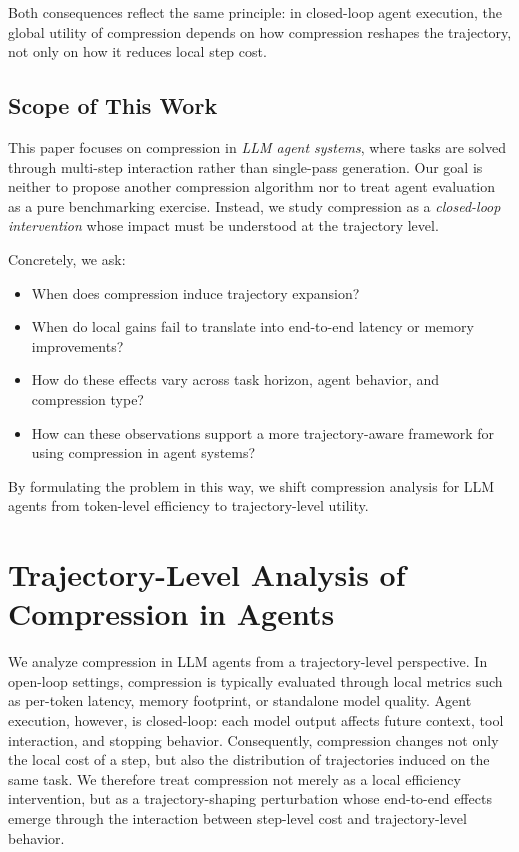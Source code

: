 \documentclass{article}
\begin{document}
Both consequences reflect the same principle: in closed-loop agent execution, the global utility of compression depends on how compression reshapes the trajectory, not only on how it reduces local step cost.

\subsection{Scope of This Work}

This paper focuses on compression in \emph{LLM agent systems}, where tasks are solved through multi-step interaction rather than single-pass generation. Our goal is neither to propose another compression algorithm nor to treat agent evaluation as a pure benchmarking exercise. Instead, we study compression as a \emph{closed-loop intervention} whose impact must be understood at the trajectory level.

Concretely, we ask:

\begin{itemize}
    \item When does compression induce trajectory expansion?
    \item When do local gains fail to translate into end-to-end latency or memory improvements?
    \item How do these effects vary across task horizon, agent behavior, and compression type?
    \item How can these observations support a more trajectory-aware framework for using compression in agent systems?
\end{itemize}

By formulating the problem in this way, we shift compression analysis for LLM agents from token-level efficiency to trajectory-level utility.


\section{Trajectory-Level Analysis of Compression in Agents}

We analyze compression in LLM agents from a trajectory-level perspective. In open-loop settings, compression is typically evaluated through local metrics such as per-token latency, memory footprint, or standalone model quality. Agent execution, however, is closed-loop: each model output affects future context, tool interaction, and stopping behavior. Consequently, compression changes not only the local cost of a step, but also the distribution of trajectories induced on the same task. We therefore treat compression not merely as a local efficiency intervention, but as a trajectory-shaping perturbation whose end-to-end effects emerge through the interaction between step-level cost and trajectory-level behavior.
\end{document}
